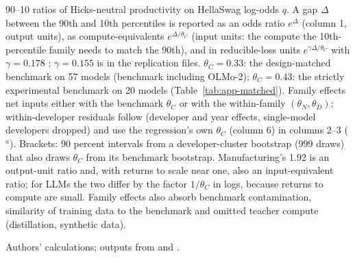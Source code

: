 \begin{table}[tp]
\begin{tablenotes}
90--10 ratios of Hicks-neutral productivity on HellaSwag log-odds $q$. A gap $\Delta$ between the 90th and 10th percentiles is reported as an odds ratio $e^{\Delta}$ (column 1, output units), as compute-equivalents $e^{\Delta/\theta_C}$ (input units: the compute the 10th-percentile family needs to match the 90th), and in reducible-loss units $e^{\gamma\Delta/\theta_C}$ with $\gamma=0.178$ \citep{besiroglu2024chinchilla}; $\gamma=0.155$ \citep{hoffmann2022training} is in the replication files. $\theta_C=0.33$: the design-matched benchmark on 57 models (benchmark including OLMo-2); $\theta_C=0.43$: the strictly experimental benchmark on 20 models (Table~\ref{tab:app-matched}). Family effects net inputs either with the benchmark $\theta_C$ or with the within-family $(\theta_N,\theta_D)$; within-developer residuals follow \citet{mertens2026secret} (developer and year effects, single-model developers dropped) and use the regression's own $\theta_C$ (column 6) in columns 2--3 ($^{a}$). Brackets: 90 percent intervals from a developer-cluster bootstrap (999 draws) that also draws $\theta_C$ from its benchmark bootstrap. Manufacturing's 1.92 is an output-unit ratio and, with returns to scale near one, also an input-equivalent ratio; for LLMs the two differ by the factor $1/\theta_C$ in logs, because returns to compute are small. Family effects also absorb benchmark contamination, similarity of training data to the benchmark and omitted teacher compute (distillation, synthetic data).
\end{tablenotes}
\begin{tablenotes}[Source]
Authors' calculations; outputs from \citet{ruan2024observational} and \citet{maiapolo2024sloth}.
\end{tablenotes}
\end{table}

